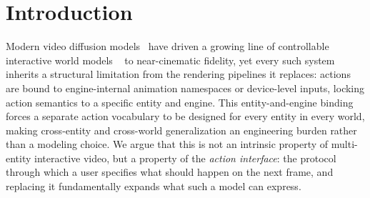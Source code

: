 \section{Introduction}
\label{sec:intro}

Modern video diffusion models~\citep{ho2022video, blattmann2023stable, wang2025wan} have driven a 
growing line of controllable interactive world models
~\citep{bruce2024genie, parkerholder2024genie2, parkerholder2025genie3, alonso2024diffusion, feng2024matrix, 
zhang2025matrixgame, he2025matrixgame2, valevski2024diffusion, oasis2024} to near-cinematic fidelity,
yet every such system inherits a structural limitation from the rendering pipelines it replaces:
actions are bound to engine-internal animation namespaces or device-level inputs, 
locking action semantics to a specific entity and engine.
This entity-and-engine binding forces a separate action vocabulary to be designed 
for every entity in every world,
making cross-entity and cross-world generalization an engineering burden rather 
than a modeling choice.
We argue that this is not an intrinsic property of multi-entity interactive video,
but a property of the \emph{action interface}: the protocol through which a user specifies what should
happen on the next frame, and replacing it fundamentally expands what such a model can express.

